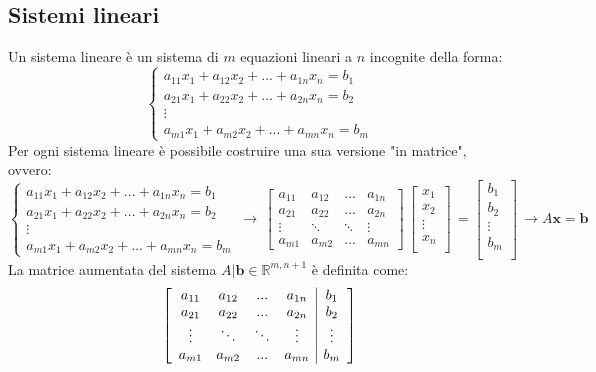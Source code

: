\documentclass{article}
\begin{document}
\subsection{Sistemi lineari} \label{subsec:matlinear}
    Un sistema lineare è un sistema di $m$ equazioni lineari a $n$ incognite della forma:
    \[
        \begin{cases}
            a_{11}x_1 + a_{12}x_2 + ... + a_{1n}x_n = b_1 \\
            a_{21}x_1 + a_{22}x_2 + ... + a_{2n}x_n = b_2 \\
            \vdots \\
            a_{m1}x_1 + a_{m2}x_2 + ... + a_{mn}x_n = b_m
        \end{cases} 
    \]
    Per ogni sistema lineare è possibile costruire una sua versione "in matrice", ovvero:
    \[
        \begin{cases}
            a_{11}x_1 + a_{12}x_2 + ... + a_{1n}x_n = b_1 \\
            a_{21}x_1 + a_{22}x_2 + ... + a_{2n}x_n = b_2 \\
            \vdots \\
            a_{m1}x_1 + a_{m2}x_2 + ... + a_{mn}x_n = b_m
        \end{cases} 
        \, 
        \rightarrow 
        \,
        \begin{bmatrix}
            a_{11} & a_{12} & ... & a_{1n} \\
            a_{21} & a_{22} & ... & a_{2n} \\
            \vdots & \ddots & \ddots & \vdots \\
            a_{m1} & a_{m2} & ... & a_{mn} 
        \end{bmatrix}
        \,
        \begin{bmatrix}
            x_{1} \\ 
            x_{2} \\
            \vdots \\
            x_{n} \\
        \end{bmatrix}
        \,
        = 
        \begin{bmatrix}
            b_{1} \\ 
            b_{2} \\
            \vdots \\
            b_{m} \\
        \end{bmatrix}
        \,
        \rightarrow
        A\mathbf{x} = \mathbf{b}
    \]
    La matrice aumentata del sistema $A | \mathbf{b} \in \mathbb{R}^{m, n+1}$ è definita come:
    \[
        \left[
        \begin{array}{cccc | c}
            a_{11} & a_{12} & ... & a_{1n} & b_1 \\
            a_{21} & a_{22} & ... & a_{2n} & b_2 \\
            \vdots & \ddots & \ddots & \vdots & \vdots \\
            a_{m1} & a_{m2} & ... & a_{mn} & b_m 
        \end{array}
        \right]
    \]
\end{document}

